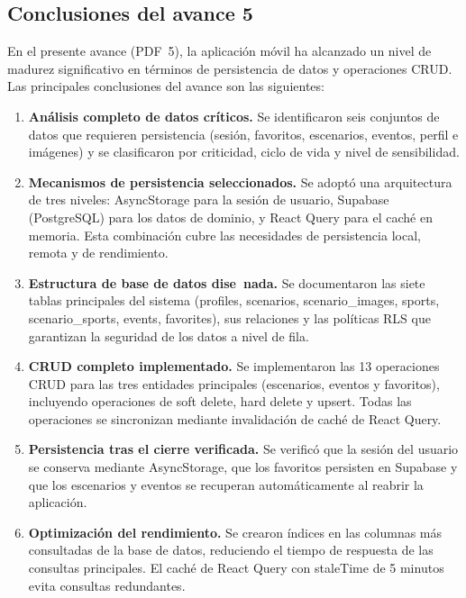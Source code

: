 
\subsection*{Conclusiones del avance 5}

En el presente avance (PDF~5), la aplicaci\'on m\'ovil \nombreApp{} ha
alcanzado un nivel de madurez significativo en t\'erminos de persistencia
de datos y operaciones CRUD. Las principales conclusiones del avance son
las siguientes:

\begin{enumerate}
  \item \textbf{An\'alisis completo de datos cr\'iticos.} Se identificaron
    seis conjuntos de datos que requieren persistencia (sesi\'on,
    favoritos, escenarios, eventos, perfil e im\'agenes) y se clasificaron
    por criticidad, ciclo de vida y nivel de sensibilidad.

  \item \textbf{Mecanismos de persistencia seleccionados.} Se adopt\'o una
    arquitectura de tres niveles: AsyncStorage para la sesi\'on de usuario,
    Supabase (PostgreSQL) para los datos de dominio, y React Query para
    el cach\'e en memoria. Esta combinaci\'on cubre las necesidades de
    persistencia local, remota y de rendimiento.

  \item \textbf{Estructura de base de datos dise~nada.} Se documentaron
    las siete tablas principales del sistema (profiles, scenarios,
    scenario\_images, sports, scenario\_sports, events, favorites), sus
    relaciones y las pol\'iticas RLS que garantizan la seguridad de los
    datos a nivel de fila.

  \item \textbf{CRUD completo implementado.} Se implementaron las 13
    operaciones CRUD para las tres entidades principales (escenarios,
    eventos y favoritos), incluyendo operaciones de soft delete, hard
    delete y upsert. Todas las operaciones se sincronizan mediante
    invalidaci\'on de cach\'e de React Query.

  \item \textbf{Persistencia tras el cierre verificada.} Se verific\'o
    que la sesi\'on del usuario se conserva mediante AsyncStorage, que
    los favoritos persisten en Supabase y que los escenarios y eventos
    se recuperan autom\'aticamente al reabrir la aplicaci\'on.

  \item \textbf{Optimizaci\'on del rendimiento.} Se crearon \'indices
    en las columnas m\'as consultadas de la base de datos, reduciendo
    el tiempo de respuesta de las consultas principales. El cach\'e de
    React Query con staleTime de 5 minutos evita consultas redundantes.


\end{enumerate}
